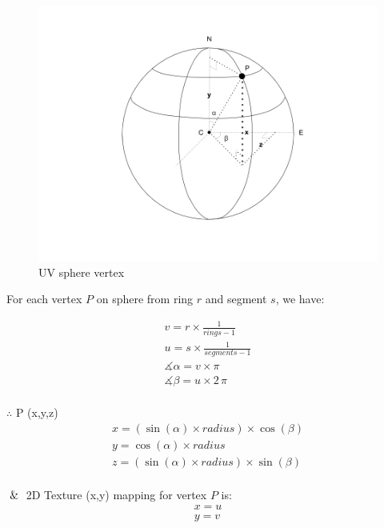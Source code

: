 \begin{figure}[H]
\caption[uv-sphere-vertex]{UV sphere vertex}
\label{fig:uv-sphere-vertex}
\centering
\includegraphics[width=\linewidth]{Figures/uv-sphere-vertex.png}
\decoRule
\end{figure}

For each vertex $P$ on sphere from ring $r$ and segment $s$, we have:

\[
\begin{array}{lr}
v = r \times  \frac{1}{rings - 1}\\
u = s \times  \frac{1}{segments - 1}\\
\measuredangle \alpha = v \times \pi\\
\measuredangle \beta = u \times 2\,\pi\\
\end{array}
\]

$\therefore$ P (x,\;y,\;z)
\[
\begin{array}{lr}
x = (\sin(\alpha) \times radius) \times \cos(\beta)\\
y = \cos(\alpha) \times radius\\
z =  (\sin(\alpha) \times radius) \times \sin(\beta)\\
\end{array}
\]

$\And$ 2D Texture (x,\;y) mapping for vertex $P$ is:
\[
\begin{array}{lr}
x = u\\
y = v\\
\end{array}
\]

